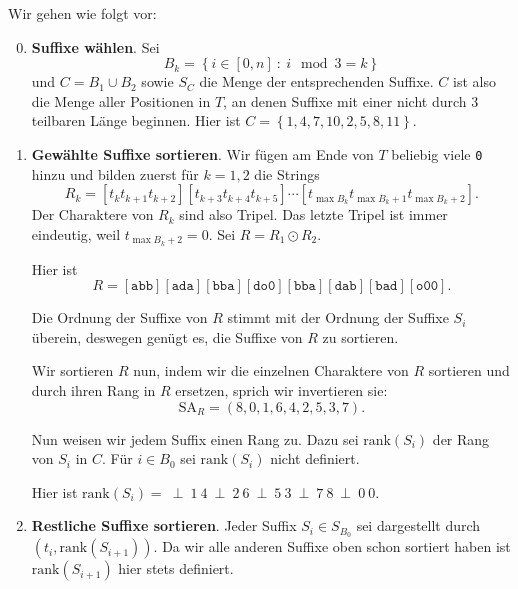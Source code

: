 Wir gehen wie folgt vor:
\begin{enumerate}
  \setcounter{enumi}{-1}
  \item \textbf{Suffixe wählen}. \quad Sei 
  \begin{equation*}
    B_k = \left \{ i \in [0,n] \ : \ i \mod 3 = k \right \}
  \end{equation*}
  und \( C = B_1 \cup B_2 \) sowie \( S_C \) die Menge der entsprechenden Suffixe. \( C \) ist also die Menge aller Positionen in \( T \), an denen Suffixe mit einer nicht durch \( 3 \) teilbaren Länge beginnen. Hier ist \( C = \left \{ 1,4,7,10,2,5,8,11 \right \} \).
  
  \item \textbf{Gewählte Suffixe sortieren}. \quad Wir fügen am Ende von \( T \) beliebig viele \texttt{0} hinzu und bilden zuerst für \( k = 1,2 \) die Strings
  \begin{equation*}
    R_k = [t_k t_{k+1} t_{k+2}][t_{k+3}t_{k+4}t_{k+5}]\cdots[t_{\max B_k}t_{\max B_{k}+1}t_{\max B_k +2}]\text{.}
  \end{equation*}
  Der Charaktere von \( R_k \) sind also Tripel. Das letzte Tripel ist immer eindeutig, weil \( t_{\max B_k + 2} = 0 \). Sei \( R = R_1 \odot R_2 \).

  Hier ist
  \begin{equation*}
    R = [\texttt{abb}][\texttt{ada}][\texttt{bba}][\texttt{do0}][\texttt{bba}][\texttt{dab}][\texttt{bad}][\texttt{o00}]\text{.}
  \end{equation*}

  Die Ordnung der Suffixe von \( R \) stimmt mit der Ordnung der Suffixe \( S_i \) überein, deswegen genügt es, die Suffixe von \( R \) zu sortieren.

  Wir sortieren \( R \) nun, indem wir die einzelnen Charaktere von \( R \) sortieren und durch ihren Rang in \( R \) ersetzen, sprich wir invertieren sie:
  \begin{equation*}
    \text{SA}_{R} = \left( 8,0,1,6,4,2,5,3,7 \right)\text{.}
  \end{equation*}

  Nun weisen wir jedem Suffix einen Rang zu. Dazu sei \( \text{rank}(S_i) \) der Rang von \( S_i \) in \( C \). Für \( i \in B_0 \) sei \( \text{rank}(S_i) \) nicht definiert.

  Hier ist \( \text{rank}(S_i) = \ \perp \ 1 \ 4 \ \perp \ 2 \ 6 \ \perp \ 5 \ 3 \ \perp \ 7 \ 8 \  \perp \ 0 \ 0 \).

  \item \textbf{Restliche Suffixe sortieren}. \quad Jeder Suffix \( S_i \in S_{B_0} \) sei dargestellt durch \( \left( t_i, \text{rank}(S_{i+1}) \right) \). Da wir alle anderen Suffixe oben schon sortiert haben ist \( \text{rank}(S_{i+1}) \) hier stets definiert.


\end{enumerate}
